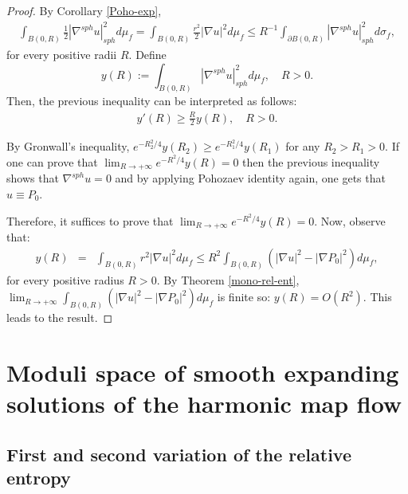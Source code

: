 \documentclass[a4paper,11pt,reqno]{amsart}
\begin{document}
\begin{proof}
By Corollary \ref{Poho-exp}, 
\begin{eqnarray*}
\int_{B(0,R)}\frac{1}{2}|\nabla^{sph} u|_{sph}^2d\mu_f=\int_{B(0,R)}\frac{r^2}{2}|\nabla u|^2d\mu_f\leq R^{-1}\int_{\partial B(0,R)}|\nabla^{sph}u|_{sph}^2d\sigma_f,
\end{eqnarray*}
for every positive radii $R$. Define $$y(R):=\int_{B(0,R)}|\nabla^{sph} u|_{sph}^2d\mu_f,\quad R>0.$$ Then, the previous inequality can be interpreted as follows:
\begin{eqnarray*}
y'(R)\geq \frac{R}{2}y(R),\quad R>0.
\end{eqnarray*}

By Gronwall's inequality, $e^{-R_2^2/4}y(R_2)\geq e^{-R_1^2/4} y(R_1)$ for any $R_2>R_1>0$. If one can prove that $\lim_{R\rightarrow+\infty} e^{-R^2/4}y(R)=0$ then the previous inequality shows that $\nabla^{sph}u=0$ and by applying Pohozaev identity again, one gets that $u\equiv P_0$. 

Therefore, it suffices to prove that $\lim_{R\rightarrow+\infty} e^{-R^2/4}y(R)=0$. Now, observe that:
\begin{eqnarray*}
y(R)&=&\int_{B(0,R)}r^2|\nabla u|^2d\mu_f\leq R^2\int_{B(0,R)}\left(|\nabla u|^2-|\nabla P_0|^2\right)d\mu_f,
\end{eqnarray*}
for every positive radius $R>0$. By Theorem \ref{mono-rel-ent}, $\lim_{R\rightarrow+\infty}\int_{B(0,R)}\left(|\nabla u|^2-|\nabla P_0|^2\right)d\mu_f$ is finite so: $y(R)=\textit{O}(R^2)$. This leads to the result.




\end{proof}





\section{Moduli space of smooth expanding solutions of the harmonic map flow}\label{section-mod-space-smooth-exp}

\subsection{First and second variation of the relative entropy}\label{fct-spa-first-sec-var-rel-ent}
\end{document}
